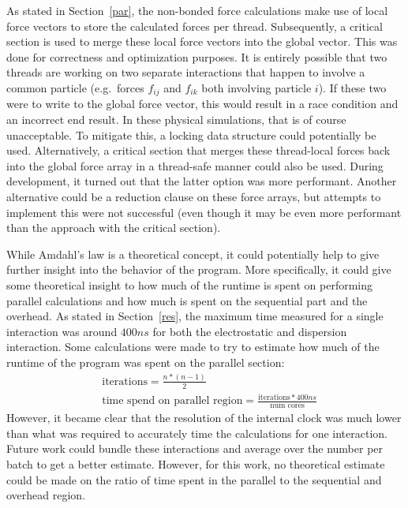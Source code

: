 \documentclass[conference]{IEEEtran}
\begin{document}
As stated in Section~\ref{par}, the non-bonded force calculations make use of local force vectors to store the
calculated forces per thread. Subsequently, a critical section is used to merge these local force vectors
into the global vector. This was done for correctness and optimization purposes. It is entirely possible that two threads
are working on two separate interactions that happen to involve a common particle (e.g.\ forces $f_{ij}$ and $f_{ik}$ both 
involving particle $i$). If these two were to write to the global force vector, this would result in a race condition
and an incorrect end result. In these physical simulations, that is of course unacceptable. To mitigate this, a
locking data structure could potentially be used. Alternatively, a critical section
that merges these thread-local forces back into the global force array in a thread-safe manner could also be used.
During development, it turned out that the latter option was more performant. 
Another alternative could be a reduction clause on these force arrays, but attempts to
implement this were not successful (even though it may be even more performant than the approach with the critical
section).



While Amdahl's law is a theoretical concept, it could potentially help to give further insight into the behavior of the
program. More specifically, it could give some theoretical insight to how much of the runtime is spent on performing
parallel calculations and how much is spent on the sequential part and the overhead.
As stated in Section~\ref{res}, the maximum time measured for a single interaction was around $400 ns$ for both
the electrostatic and dispersion interaction. Some calculations were made to try to estimate how much of the runtime
of the program was spent on the parallel section:
\begin{align*}
    &\text{iterations} = \frac{n*(n-1)}{2}\\
    &\text{time spend on parallel region} = \frac{\text{iterations}*400ns}{\text{num cores}}
\end{align*} 
However, it became clear that the resolution of the internal clock was much lower than what was required to accurately
time the calculations for one interaction. Future work could bundle these interactions and average over the number
per batch to get a better estimate. However, for this work, no theoretical estimate could be made on the ratio of
time spent in the parallel to the sequential and overhead region.
\end{document}

